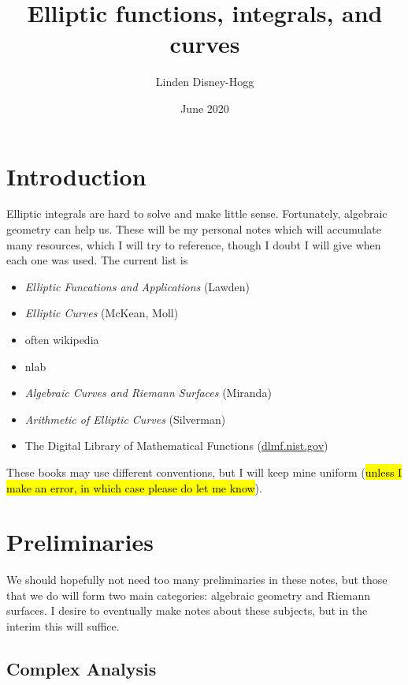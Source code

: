\documentclass{article}
\title{Elliptic functions, integrals, and curves}
\author{Linden Disney-Hogg}
\date{June 2020}
\begin{document}
\maketitle
\tableofcontents

\section{Introduction}
Elliptic integrals are hard to solve and make little sense. Fortunately, algebraic geometry can help us. These will be my personal notes which will accumulate many resources, which I will try to reference, though I doubt I will give when each one was used. The current list is 
\begin{itemize}
	\item \textit{Elliptic Funcations and Applications} (Lawden)
	\item \textit{Elliptic Curves} (McKean, Moll) 
	\item often wikipedia
	\item nlab
	\item \textit{Algebraic Curves and Riemann Surfaces} (Miranda)
	\item \textit{Arithmetic of Elliptic Curves} (Silverman)
	\item The Digital Library of Mathematical Functions (\href{dlmf.nist.gov}{dlmf.nist.gov})
\end{itemize}
These books may use different conventions, but I will keep mine uniform (\hl{unless I make an error, in which case please do let me know}). 

\section{Preliminaries}
We should hopefully not need too many preliminaries in these notes, but those that we do will form two main categories: algebraic geometry and Riemann surfaces. I desire to eventually make notes about these subjects, but in the interim this will suffice. 

\subsection{Complex Analysis}
\end{document}

